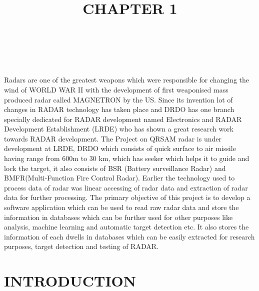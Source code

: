 \documentclass[14pt]{article} %
\begin{document}
\newpage
\thispagestyle{plain}
\section*{\LARGE\bfseries{\\ }}
Radars are one of the greatest weapons which were responsible for changing the wind of WORLD WAR II with the development of first weaponised mass produced radar called MAGNETRON by the US. Since its invention lot of changes in RADAR technology has taken place and DRDO has one branch specially dedicated for RADAR development named Electronics and RADAR Development Establishment (LRDE) who has shown a great research work towards RADAR development. The Project on QRSAM radar is under development at LRDE, DRDO which consists of quick surface to air missile having range from 600m to 30 km, which has seeker which helps it to guide and lock the target, it also consists of BSR (Battery surveillance Radar) and BMFR(Multi-Function Fire Control Radar). Earlier the technology used to process data of radar was linear accessing of radar data and extraction of radar data for further processing. The primary objective of this project is to develop a software application which can be used to read raw radar data and store the information in databases which can be further used for other purposes like analysis, machine learning and automatic target detection etc. It also stores the information of each dwells in databases which can be easily extracted for research purposes, target detection and testing of RADAR.


\newpage
\thispagestyle{plain}

\tableofcontents
\thispagestyle{plain}

\newpage

\listoffigures
\thispagestyle{plain}

\listoftables
\thispagestyle{plain}

\newpage

\title{\textbf{\huge {CHAPTER 1}}}
\maketitle
{}
\setcounter{page}{1}
\section{INTRODUCTION}
\end{document}
